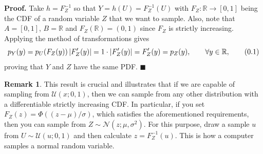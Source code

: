 \documentclass[10pt]{article}
\theoremstyle{definition}
\newtheorem*{rem}{Remark}
\newenvironment{prf}{\noindent\textbf{Proof.}}{\hfill$\blacksquare$}
\newcommand\eqnum{\addtocounter{equation}{1}\tag{\arabic{section}.\arabic{equation}}}
\begin{document}
\begin{prf}
Take $h=F_Z^{-1}$ so that $Y=h(U) = F_Z^{-1}(U)$ with $F_Z:\mathbb{R} \to [0, 1]$ being the CDF of a random variable $Z$ that we want to sample. Also, note that $A=[0, 1]$, $B=\mathbb{R}$ and $F_Z(\mathbb{R})=(0, 1)$ since $F_Z$ is strictly increasing. Applying the method of transformations gives
\begin{equation*}
p_Y(y) = p_U(F_Z(y))\left|F_Z'(y)\right|=1\cdot\left|F_Z'(y)\right|= F_Z'(y)=p_Z(y),  \qquad \forall y \in \mathbb{R},
\eqnum
\end{equation*}
proving that $Y$ and $Z$ have the same PDF.
\end{prf}
\newline
\begin{rem}
This result is crucial and illustrates that if we are capable of sampling from $\mathcal{U}(x; 0, 1)$, then we can sample from any other distribution with a differentiable strictly increasing CDF. In particular, if you set $F_Z(z) = \Phi((z-\mu)/\sigma)$, which satisfies the aforementioned requirements, then you can sample from $Z\sim\mathcal{N}(z; \mu, \sigma^2)$. For this purpose, draw a sample $u$ from $U\sim\mathcal{U}(u; 0, 1)$ and then calculate $z=F_Z^{-1}(u)$. This is how a computer samples a normal random variable.
\end{rem}
\end{document}

